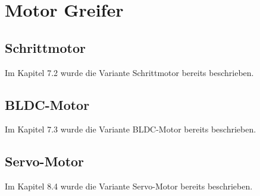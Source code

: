
\section{Motor Greifer}


\subsection{Schrittmotor}
Im Kapitel 7.2 wurde die Variante Schrittmotor bereits beschrieben.

\subsection{BLDC-Motor}
Im Kapitel 7.3 wurde die Variante BLDC-Motor bereits beschrieben.

\subsection{Servo-Motor}
Im Kapitel 8.4 wurde die Variante Servo-Motor bereits beschrieben.
\pagebreak